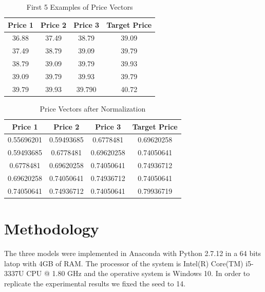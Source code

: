 \begin{table}{}
\begin{center}
\begin{tabular}{ c | c | c | c }
    \hline
     \textbf{Price 1} &  \textbf{Price 2} &    \textbf{Price 3} &   \textbf{Target Price}\\ \hline
    36.88&  37.49&  38.79 &39.09\\ \hline
    37.49&  38.79&  39.09&39.79\\ \hline
    38.79&  39.09&  39.79&39.93\\ \hline
   39.09&  39.79&  39.93&39.79\\ \hline
    39.79&  39.93&  39.790&40.72\\ \hline
    \hline
  \end{tabular}
\caption{First 5 Examples of Price Vectors}
 \label{table:trainPrices}
\end{center}

 \end{table}


\begin{table}{}
\begin{center}
\begin{tabular}{ c | c | c | c }
    \hline
    \textbf{Price 1} &  \textbf{Price 2} &    \textbf{Price 3} &   \textbf{Target Price} \\ \hline
    0.55696201 &  0.59493685&  0.6778481 &0.69620258\\ \hline
    0.59493685 &  0.6778481 &  0.69620258 &0.74050641\\ \hline
     0.6778481 &  0.69620258 &  0.74050641&0.74936712\\ \hline
     0.69620258 & 0.74050641 &  0.74936712 &0.74050641\\ \hline
     0.74050641 &  0.74936712 &  0.74050641 &0.79936719\\ \hline
    \hline
  \end{tabular}
\caption{Price Vectors after Normalization}
\end{center}
\label{table:train}
 \end{table}
 
 \section{Methodology}

The three models were implemented in Anaconda with Python 2.7.12 in a 64 bits latop with 4GB of RAM. The processor of the system is Intel(R) Core(TM) i5-3337U CPU @ 1.80 GHz and the operative system is Windows 10. In order to replicate the experimental results we fixed the seed to 14. 
